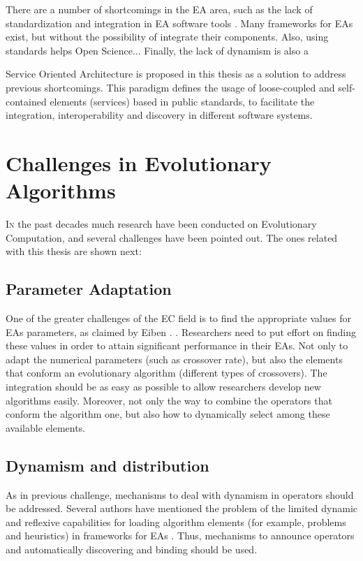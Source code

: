 There are a number of shortcomings in the EA area, such as the lack of standardization and integration in EA software tools \cite{SURVEYMOFS}. Many frameworks for EAs exist, but without the possibility of integrate their components. Also, using standards helps Open Science... Finally, the lack of dynamism is also a 

Service Oriented Architecture \cite{Papazoglou2007SOA} is proposed in this thesis as a solution to address previous shortcomings. This paradigm defines the usage of loose-coupled and self-contained elements (services) based in public standards, to facilitate the integration, interoperability and discovery in different software systems.


\section{Challenges in Evolutionary Algorithms}
\label{sec:intro:challenges}

\lettrine{I}{n} the past decades much research have been conducted on Evolutionary Computation, and several challenges have been pointed out. The ones related with this thesis are shown next:

\subsection{Parameter Adaptation}

One of the greater challenges of the EC field is to find the appropriate values for EAs parameters, as claimed by {\person Eiben \etal.} 
\cite{Eiben12Parameters}. Researchers need to put effort on finding these values in order to
attain significant performance in their EAs. Not only to adapt the numerical parameters (such as crossover rate), but also the elements that conform an evolutionary algorithm (different types of crossovers). The integration should be as easy as possible to allow researchers develop new algorithms easily. Moreover, not only the way to combine the operators that conform the algorithm one, but also how to dynamically select among these available elements. 

\subsection{Dynamism and distribution}
As in previous challenge, mechanisms to deal with dynamism in operators should be addressed. Several authors have mentioned the problem of the limited dynamic and reflexive capabilities for loading algorithm elements (for example, problems and heuristics) in frameworks for EAs \cite{SURVEYMOFS}. Thus, mechanisms to announce operators and automatically discovering and binding should be used.

